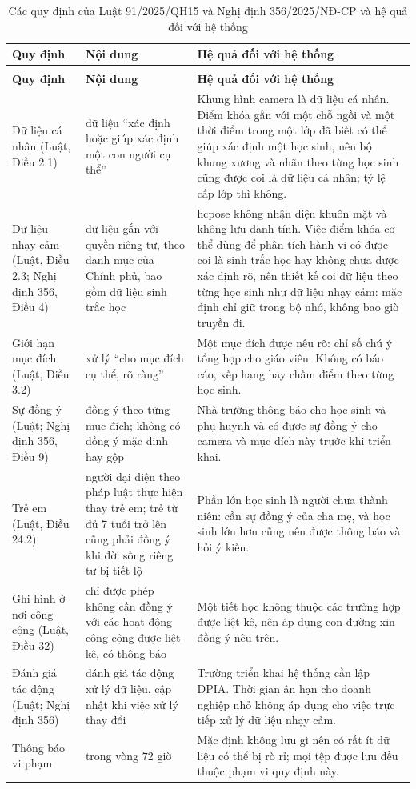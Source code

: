 \begingroup\small
\begin{xltabular}{\textwidth}{*{3}{>{\raggedright\arraybackslash}X}}
\caption{Các quy định của Luật 91/2025/QH15 và Nghị định 356/2025/NĐ-CP và hệ quả đối với hệ thống}\label{tab:provisions-of-law-91-2025-qh15-and-decre}\\
\toprule
\textbf{Quy định} & \textbf{Nội dung} & \textbf{Hệ quả đối với hệ thống} \\
\midrule
\endfirsthead
{}\\
\toprule
\textbf{Quy định} & \textbf{Nội dung} & \textbf{Hệ quả đối với hệ thống} \\
\midrule
\endhead
\bottomrule
\endlastfoot
Dữ liệu cá nhân (Luật, Điều 2.1) & dữ liệu ``xác định hoặc giúp xác định một con người cụ thể'' & Khung hình camera là dữ liệu cá nhân. Điểm khóa gắn với một chỗ ngồi và một thời điểm trong một lớp đã biết có thể giúp xác định một học sinh, nên bộ khung xương và nhãn theo từng học sinh cũng được coi là dữ liệu cá nhân; tỷ lệ cấp lớp thì không. \\
Dữ liệu nhạy cảm (Luật, Điều 2.3; Nghị định 356, Điều 4) & dữ liệu gắn với quyền riêng tư, theo danh mục của Chính phủ, bao gồm dữ liệu sinh trắc học & hcpose không nhận diện khuôn mặt và không lưu danh tính. Việc điểm khóa cơ thể dùng để phân tích hành vi có được coi là sinh trắc học hay không chưa được xác định rõ, nên thiết kế coi dữ liệu theo từng học sinh như dữ liệu nhạy cảm: mặc định chỉ giữ trong bộ nhớ, không bao giờ truyền đi. \\
Giới hạn mục đích (Luật, Điều 3.2) & xử lý ``cho mục đích cụ thể, rõ ràng'' & Một mục đích được nêu rõ: chỉ số chú ý tổng hợp cho giáo viên. Không có báo cáo, xếp hạng hay chấm điểm theo từng học sinh. \\
Sự đồng ý (Luật; Nghị định 356, Điều 9) & đồng ý theo từng mục đích; không có đồng ý mặc định hay gộp & Nhà trường thông báo cho học sinh và phụ huynh và có được sự đồng ý cho camera và mục đích này trước khi triển khai. \\
Trẻ em (Luật, Điều 24.2) & người đại diện theo pháp luật thực hiện thay trẻ em; trẻ từ đủ 7 tuổi trở lên cũng phải đồng ý khi đời sống riêng tư bị tiết lộ & Phần lớn học sinh là người chưa thành niên: cần sự đồng ý của cha mẹ, và học sinh lớn hơn cũng nên được thông báo và hỏi ý kiến. \\
Ghi hình ở nơi công cộng (Luật, Điều 32) & chỉ được phép không cần đồng ý với các hoạt động công cộng được liệt kê, có thông báo & Một tiết học không thuộc các trường hợp được liệt kê, nên áp dụng con đường xin đồng ý nêu trên. \\
Đánh giá tác động (Luật; Nghị định 356) & đánh giá tác động xử lý dữ liệu, cập nhật khi việc xử lý thay đổi & Trường triển khai hệ thống cần lập DPIA. Thời gian ân hạn cho doanh nghiệp nhỏ không áp dụng cho việc trực tiếp xử lý dữ liệu nhạy cảm. \\
Thông báo vi phạm & trong vòng 72 giờ & Mặc định không lưu gì nên có rất ít dữ liệu có thể bị rò rỉ; mọi tệp được lưu đều thuộc phạm vi quy định này. \\
\end{xltabular}
\endgroup

